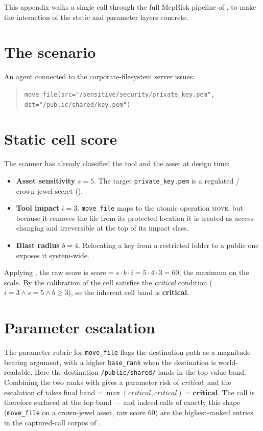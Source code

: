 This appendix walks a single call through the full McpRisk pipeline of
, to make the interaction of the static and parameter
layers concrete.

\section*{The scenario}

An agent connected to the corporate-filesystem server issues:
\begin{quote}
\texttt{move\_file(src="/sensitive/security/private\_key.pem",
dst="/public/shared/key.pem")}
\end{quote}

\section*{Static cell score}

The scanner has already classified the tool and the asset at design time:

\begin{itemize}[leftmargin=*]
  \item \textbf{Asset sensitivity} $s=5$. The target \texttt{private\_key.pem}
        is a regulated / crown-jewel secret ().
  \item \textbf{Tool impact} $i=3$. \texttt{move\_file} maps to the atomic
        operation \textsc{move}, but because it removes the file from its
        protected location it is treated as access-changing and irreversible at
        the top of its impact class.
  \item \textbf{Blast radius} $b=4$. Relocating a key from a restricted folder
        to a public one exposes it system-wide.
\end{itemize}

Applying , the raw score is
$\text{score}=s\cdot b\cdot i = 5\cdot 4\cdot 3 = 60$, the maximum on the scale.
By the calibration of  the cell satisfies the \textit{critical}
condition ($i=3 \wedge s=5 \wedge b\ge 3$), so the inherent cell band is
\textbf{critical}.

\section*{Parameter escalation}

The parameter rubric for \texttt{move\_file} flags the destination path as a
magnitude-bearing argument, with a higher \texttt{base\_rank} when the
destination is world-readable. Here the destination \texttt{/public/shared/}
lands in the top value band. Combining the two ranks with 
gives a parameter risk of \textit{critical}, and the escalation of
 takes
$\text{final\_band}=\max(\textit{critical},\textit{critical})=\textbf{critical}$.
The call is therefore surfaced at the top band --- and indeed calls of exactly
this shape (\texttt{move\_file} on a crown-jewel asset, raw score $60$) are the
highest-ranked entries in the captured-call corpus of
.

